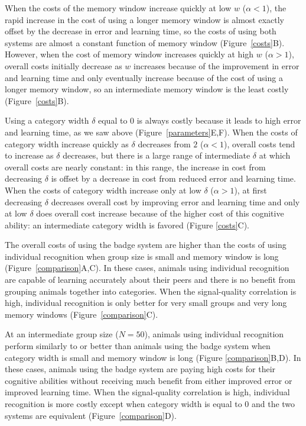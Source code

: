 When the costs of the memory window increase quickly at low $w$ ($\alpha<1$), the rapid increase in the cost of using a longer memory window is almost exactly offset by the decrease in error and learning time, so the costs of using both systems are almost a constant function of memory window (Figure~\ref{costs}B). However, when the cost of memory window increases quickly at high $w$ ($\alpha>1$), overall costs initially decrease as $w$ increases because of the improvement in error and learning time and only eventually increase because of the cost of using a longer memory window, so an intermediate memory window is the least costly (Figure~\ref{costs}B).

Using a category width $\delta$ equal to $0$ is always costly because it leads to high error and learning time, as we saw above (Figure~\ref{parameters}E,F).  When the costs of category width increase quickly as $\delta$ decreases from $2$ ($\alpha<1$), overall costs tend to increase as $\delta$ decreases, but there is a large range of intermediate $\delta$ at which overall costs are nearly constant: in this range, the increase in cost from decreasing $\delta$ is offset by a decrease in cost from reduced error and learning time. When the costs of category width increase only at low $\delta$ ($\alpha>1$), at first decreasing $\delta$ decreases overall cost by improving error and learning time and only at low $\delta$ does overall cost increase because of the higher cost of this cognitive ability: an intermediate category width is favored (Figure \ref{costs}C).

The overall costs of using the badge system are higher than the costs of using individual recognition when group size is small and memory window is long (Figure~\ref{comparison}A,C). In these cases, animals using individual recognition are capable of learning accurately about their peers and there is no benefit from grouping animals together into categories. When the signal-quality correlation is high, individual recognition is only better for very small groups and very long memory windows (Figure~\ref{comparison}C). 

At an intermediate group size ($N=50$), animals using individual recognition perform similarly to or better than animals using the badge system when category width is small and memory window is long (Figure \ref{comparison}B,D). In these cases, animals using the badge system are paying high costs for their cognitive abilities without receiving much benefit from either improved error or improved learning time. When the signal-quality correlation is high, individual recognition is more costly except when category width is equal to $0$ and the two systems are equivalent (Figure~\ref{comparison}D). 

